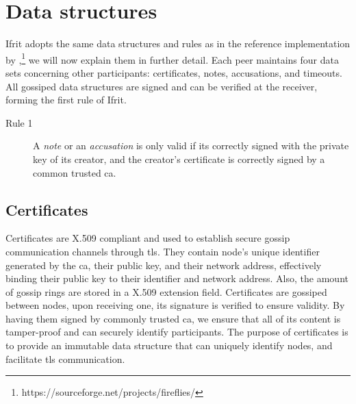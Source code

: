 \documentclass[USenglish]{uit-thesis}
\begin{document}
\section{Data structures}
Ifrit adopts the same data structures and rules as in the reference implementation by \cite{flies},\footnote{https://sourceforge.net/projects/fireflies/} we will now explain them in further detail.
Each peer maintains four data sets concerning other participants: certificates, notes, accusations, and timeouts.
All gossiped data structures are signed and can be verified at the receiver, forming the first rule of Ifrit. 
\begin{description}
	\item[Rule 1] A \textit{note} or an \textit{accusation} is only valid if its correctly signed with the private key of its creator, and the creator's certificate is correctly signed by a common trusted \gls{ca}.
\end{description}

\subsection{Certificates}
Certificates are X.509 compliant and used to establish secure gossip communication channels through \gls{tls}.
They contain node's unique identifier generated by the \acrfull{ca}, their public key, and their network address, effectively binding their public key to their identifier and network address.  
Also, the amount of gossip rings are stored in a X.509 extension field.
Certificates are gossiped between nodes, upon receiving one, its signature is verified to ensure validity.
By having them signed by commonly trusted \gls{ca}, we ensure that all of its content is tamper-proof and can securely identify participants.
The purpose of certificates is to provide an immutable data structure that can uniquely identify nodes, and facilitate \gls{tls} communication.
\end{document}
